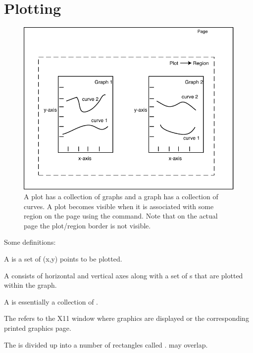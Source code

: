 \chapter{Plotting}
\label{c:plotting}

\begin{figure}[tb]
  \centering
  \includegraphics{plot.pdf}
  \caption[A plot has a collection of graphs.]
{A plot has a collection of graphs and a graph has a 
collection of curves. A plot becomes visible when it is associated
with some region on the page using the  command. Note that
on the actual page the plot/region border is not visible.}
  \label{f:plot}
\end{figure}

Some definitions:
  \vspace*{-3ex}
\begin{description}
\item[Curve] \Newline
A  is a set of (x,y) points to be plotted.
\item[Graph] \Newline
A  consists of horizontal and vertical axes along with a set
of s that are plotted within the graph. 
\item[Plot] \Newline
A  is essentially a collection of .
\item[Page] \Newline
The  refers to the X11 window where graphics are displayed or the 
corresponding printed graphics page.
\item[Region] \Newline
The  is divided up into a number of rectangles called
.  may overlap.
\end{description}

